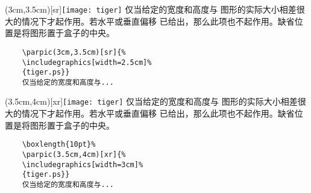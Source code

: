 \hspace{-1.5cm}\begin{minipage}[b]{.5\textwidth}
	\parpic(3cm,3.5cm)[sr]{\texttt{[image: tiger]}}
	仅当给定的宽度和高度与
	图形的实际大小相差很大的情况下才起作用。若水平或垂直偏移
	已给出，那么此项也不起作用。缺省位置是将图形置于盒子的中央。
	\par\vspace{0pt}
\end{minipage}%
\hspace{10pt}\begin{minipage}[b]{.5\textwidth}
	\begin{Verbatim}
	\parpic(3cm,3.5cm)[sr]{%
	\includegraphics[width=2.5cm]%
	{tiger.ps}}
	仅当给定的宽度和高度与...
	\end{Verbatim}
	\par\vspace{0pt}
\end{minipage}

\hspace{-1.5cm}\begin{minipage}[b]{.5\textwidth}
	\boxlength{10pt}%
	\parpic(3.5cm,4cm)[xr]{\texttt{[image: tiger]}}
	仅当给定的宽度和高度与
	图形的实际大小相差很大的情况下才起作用。若水平或垂直偏移
	已给出，那么此项也不起作用。缺省位置是将图形置于盒子的中央。
	\par\vspace{0pt}
\end{minipage}%
\hspace{10pt}\begin{minipage}[b]{.5\textwidth}
	\begin{Verbatim}
	\boxlength{10pt}%
	\parpic(3.5cm,4cm)[xr]{%
	\includegraphics[width=3cm]%
	{tiger.ps}}
	仅当给定的宽度和高度与...
	\end{Verbatim}
	\par\vspace{0pt}
\end{minipage}



\endinput